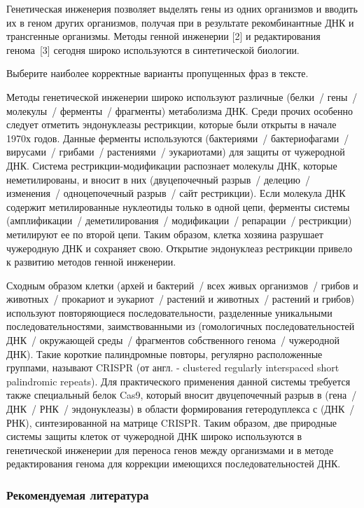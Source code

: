 
Генетическая инженерия позволяет выделять гены из одних организмов и вводить их в геном других организмов, получая при в результате рекомбинантные ДНК и трансгенные организмы. Методы генной инженерии [2] и редактирования генома~[3] сегодня широко используются в синтетической биологии. 

Выберите наиболее корректные варианты пропущенных фраз в тексте.

Методы генетической инженерии широко используют различные (белки~/ гены~/ молекулы~/ ферменты~/ фрагменты) 
метаболизма ДНК. Среди прочих особенно следует отметить эндонуклеазы рестрикции, которые были открыты в начале 1970х годов. Данные ферменты используются 
(бактериями~/ бактериофагами~/ вирусами~/ грибами~/ растениями~/ эукариотами) 
для защиты от чужеродной ДНК. Система рестрикции-модификации распознает молекулы ДНК, которые неметилированы, и вносит в них 
(двуцепочечный разрыв~/ делецию~/ изменения~/ одноцепочечный разрыв~/ сайт рестрикции). Если молекула ДНК содержит метилированные нуклеотиды только в одной цепи, ферменты системы 
(амплификации~/ деметилирования~/ модификации~/ репарации~/ рестрикции) 
метилируют ее по второй цепи. Таким образом, клетка хозяина разрушает чужеродную ДНК и сохраняет свою. Открытие эндонуклеаз рестрикции привело к развитию методов генной инженерии. 

Сходным образом клетки (архей и бактерий~/ всех живых организмов~/ грибов и животных~/ прокариот и эукариот~/ растений и животных~/ растений и грибов) 
используют повторяющиеся последовательности, разделенные уникальными последовательностями, заимствованными из 
(гомологичных последовательностей ДНК~/ окружающей среды~/ фрагментов собственного генома~/ чужеродной ДНК). Такие короткие палиндромные повторы, регулярно расположенные группами, называют CRISPR (от англ. - clustered regularly interspaced short palindromic repeats). Для практического применения данной системы требуется также специальный белок Cas9, который вносит двуцепочечный разрыв в 
(гена~/ ДНК~/ РНК~/ эндонуклеазы) в области формирования гетеродуплекса с (ДНК~/ РНК), синтезированной на матрице CRISPR. Таким образом, две природные системы защиты клеток от чужеродной ДНК широко используются в генетической инженерии для переноса генов между организмами и в методе редактирования генома для коррекции имеющихся последовательностей ДНК. 

\subsubsection*{Рекомендуемая литература}

